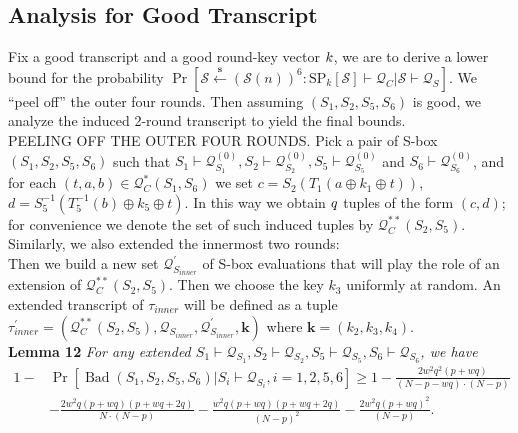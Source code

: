 \subsection{Analysis for Good Transcript}

\noindent Fix a good transcript and a good round-key vector $\mathnormal{k}$, we are to derive a lower bound for the probability  $\operatorname{Pr}\left[\mathcal{S} \stackrel{\mathbf{s}}{\leftarrow}(\mathcal{S}(n))^{6}: \mathrm{SP}_{k}[\mathcal{S}] \vdash \mathcal{Q}_{C} | \mathcal{S} \vdash \mathcal{Q}_{S}\right]$. We ``peel off'' the outer four rounds. Then assuming $(S_{1}, S_2, S_{5}, S_6)$ is good, we analyze the induced 2-round transcript to yield the final bounds.\\

\noindent
\textsc{PEELING OFF THE OUTER FOUR ROUNDS}. Pick a pair of S-box $(S_1, S_2, S_{5}, S_6)$ such that $S_{1} \vdash \mathcal{Q}_{S_{1}}^{(0)}, S_{2} \vdash \mathcal{Q}_{S_{2}}^{(0)}, S_{5} \vdash \mathcal{Q}_{S_{5}}^{(0)}$   and $S_{6} \vdash \mathcal{Q}_{S_{6}}^{(0)}$, and for each $ (t, a, b) \in \mathcal{Q}_{C}^{*}\left(S_{1}, S_{6}\right)$ we set $c=S_{2}\left(T_1\left(a \oplus k_{1} \oplus t\right)\right)$, $d=S_{5}^{-1}\left(T_5^{-1}\left(b\right) \oplus k_{5} \oplus t\right)$. In this way we obtain $\mathnormal{q}$ tuples of the form $(c, d)$; for convenience we denote the set of such induced tuples by $\mathcal{Q}_{C}^{**}\left(S_{2}, S_{5}\right)$. Similarly, we also extended the innermost two rounds:\\

Then we build a new set $\mathcal{Q}_{S_{inner}}^{\prime}$ of S-box evaluations that will play the role of an extension of $\mathcal{Q}_{C}^{**}\left(S_{2}, S_{5}\right)$. Then we choose the key $k_3$ uniformly at random. An extended transcript of $\tau_{inner}$ will be defined as a tuple $\tau_{inner}^{\prime}=\left(\mathcal{Q}_{C}^{**}\left(S_{2}, S_{5}\right), \mathcal{Q}_{S_{inner}}, \mathcal{Q}_{S_{inner}}^{\prime}, \mathbf{k}\right)$ where $\mathbf{k}=\left(k_{2}, k_{3}, k_{4}\right)$.\\

\noindent \textbf{Lemma 12} \emph{ For any extended $S_{1} \vdash \mathcal{Q}_{S_{1}}, S_{2} \vdash \mathcal{Q}_{S_{2}}, S_{5} \vdash \mathcal{Q}_{S_{5}}, S_{6} \vdash \mathcal{Q}_{S_{6}}$, we have}
\begin{equation}
\begin{aligned}
1-&\operatorname{Pr}\left[\operatorname{Bad}\left(S_{1}, S_2, S_{5}, S_6\right) | S_{i} \vdash \mathcal{Q}_{S_{i}}, i = 1, 2, 5, 6\right] \geq 1- \frac{2 w^{2} q^{2} (p+w q)}{(N- p- wq) \cdot (N-p)}\\
& -\frac{2 w^{2} q (p+w q)(p+w q+2 q)}{N \cdot (N-p)} - \frac{w^{2} q (p+w q)(p+w q+2 q)}{(N-p)^2} - \frac{2 w^{2} q (p+w q)^{2}}{(N-p)}.
\end{aligned}
\end{equation}

